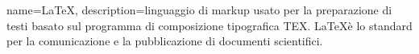 {
	name=LaTeX,
	description={linguaggio di markup usato per la preparazione di testi basato sul programma di composizione tipografica TEX. \LaTeX è lo standard per la comunicazione e la pubblicazione di documenti scientifici.}
}
